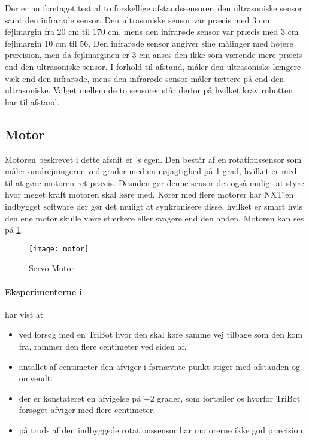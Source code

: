 Der er nu foretaget test af to forskellige afstandssensorer, den ultrasoniske sensor samt den infrarøde sensor. 
Den ultrasoniske sensor var præcis med 3 cm fejlmargin fra 20 cm til 170 cm, mens den infrarøde sensor var præcis med 3 cm fejlmargin 10 cm til 56.
Den infrarøde sensor angiver sine målinger med højere præcision, men da fejlmarginen er 3 cm anses den ikke som værende mere præcis end den ultrasoniske sensor.
I forhold til afstand, måler den ultrasoniske længere væk end den infrarøde, mens den infrarøde sensor måler tættere på end den ultrasoniske.
Valget mellem de to sensorer står derfor på hvilket krav robotten har til afstand.

\subsection{Motor}
Motoren beskrevet i dette afsnit er \lego's egen.
Den består af en rotationssensor som måler omdrejningerne ved grader med en nøjagtighed på 1 grad, hvilket er med til at gøre motoren ret præcis. 
Desuden gør denne sensor det også muligt at styre hvor meget kraft motoren skal køre med.
Kører med flere motorer har NXT'en indbygget software der gør det muligt at synkronisere disse, hvilket er smart hvis den ene motor skulle være stærkere eller svagere end den anden.\cite{tikNXT}
Motoren kan ses på \cref{sensor:motor_sensor}.
\\

\begin{figure}[h]
\centering
\texttt{[image: motor]} 	
\caption{\legoms Servo Motor}
\label{sensor:motor_sensor}
\end{figure}

\paragraph{Eksperimenterne i \citet{tikNXT}} har vist at
\begin{itemize}
\item ved forsøg med en TriBot hvor den skal køre samme vej tilbage som den kom fra, rammer den flere centimeter ved siden af.
\item antallet af centimeter den afviger i førnævnte punkt stiger med afstanden og omvendt. 
\item der er konstateret en afvigelse på $\pm$2 grader, som fortæller os hvorfor TriBot forsøget afviger med flere centimeter.
\item på trods af den indbyggede rotationssensor har motorerne ikke god præcision.
\end{itemize}

